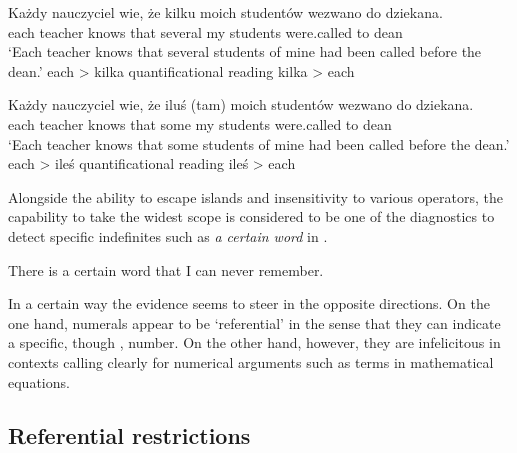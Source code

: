 \documentclass[output=paper, newtxmath, colorlinks, citecolor=brown]{langsci/langscibook}
\begin{document}
	\ea \gll Każdy nauczyciel wie, że kilku moich studentów wezwano do dziekana.\label{ex:indef-scope-kilka}\\
	each teacher knows that several my students were.called to dean\\
	\glt `Each teacher knows that several students of mine had been called before the dean.'
	\ea each > kilka \hfill quantificational reading\label{ex:indef-scope-kilka-quantificational}
	\ex kilka > each \hfill {}\label{ex:indef-scope-kilka-specific}
	\z
    \z

    \ea \gll Każdy nauczyciel wie, że {iluś (tam)} moich studentów wezwano do dziekana.\label{ex:indef-scope-iles}\\
	each teacher knows that some my students were.called to dean\\
	\glt `Each teacher knows that some students of mine had been called before the dean.'
	\ea each > ileś \hfill quantificational reading\label{ex:indef-scope-iles-quantificational}
	\ex ileś > each \hfill {}\label{ex:indef-scope-iles-specific}
	\z
    \z

	\noindent Alongside the ability to escape islands and insensitivity to various operators, the capability to take the widest scope is considered to be one of the diagnostics to detect specific indefinites such as \textit{a certain word} in .

	\ea There is a certain word that I can never remember.\label{ex:specific-indefinite}
    \z

\noindent In a certain way the evidence seems to steer in the opposite directions. On the one hand,  numerals appear to be `referential' in the sense that they can indicate a specific, though , number. On the other hand, however, they are infelicitous in contexts calling clearly for numerical arguments such as terms in mathematical equations.

	\subsection{Referential restrictions}\label{sec:referential-restrictions}
\end{document}
